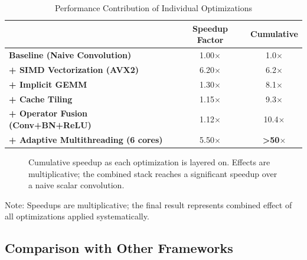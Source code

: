 \documentclass[12pt,oneside,a4paper]{report}
\newcommand{\hdr}{\rowcolor{mnHeaderBg}}
\newcommand{\hcell}[1]{{\bfseries\color{white}#1}}
\newcommand{\win}[1]{{\bfseries\color{mnGreen}#1}}
\newcommand{\zebra}{\rowcolors{2}{mnRowA}{mnRowB}}
\newenvironment{ptable}[2]{%
  \begin{table}[H]\centering
  \caption{#1}%
  \vspace{2pt}%
  \zebra
  \setlength{\arrayrulewidth}{0.5pt}%
  \begin{tabular}{#2}\toprule}%
  {\bottomrule\end{tabular}\end{table}}
\begin{document}
\begin{ptable}{Performance Contribution of Individual Optimizations}{>{\bfseries\color{mnPrimary}}l c c}
\hdr \hcell{Optimization Technique} & \hcell{Speedup Factor} & \hcell{Cumulative} \\ \midrule
Baseline (Naive Convolution)        & 1.00$\times$ & 1.0$\times$ \\
+ SIMD Vectorization (AVX2)         & 6.20$\times$ & 6.2$\times$ \\
+ Implicit GEMM                     & 1.30$\times$ & 8.1$\times$ \\
+ Cache Tiling                      & 1.15$\times$ & 9.3$\times$ \\
+ Operator Fusion (Conv+BN+ReLU)    & 1.12$\times$ & 10.4$\times$ \\
+ Adaptive Multithreading (6 cores) & 5.50$\times$ & \win{>50$\times$} \\
\end{ptable}

\begin{figure}[H]
\centering
{}
\caption[Cumulative speedup of layered optimizations]{Cumulative speedup as each optimization is layered on. Effects are multiplicative; the combined stack reaches a significant speedup over a naive scalar convolution.}
\label{fig:optstack}
\end{figure}

Note: Speedups are multiplicative; the final result represents combined effect of all optimizations applied systematically.

\subsection{Comparison with Other Frameworks}
\end{document}
